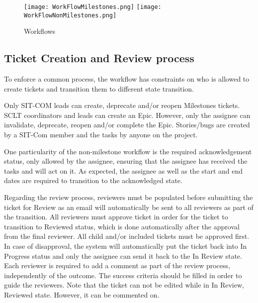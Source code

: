 \documentclass[SE,authoryear,toc]{lsstdoc}
\begin{document}
\begin{figure}[h]
\begin{center}
\texttt{[image: WorkFlowMilestones.png]}
\texttt{[image: WorkFlowNonMilestones.png]}
\caption{\label{fig:workflow} Workflows}
\end{center}
\end{figure}


\subsection{Ticket Creation and Review process}
To enforce a common process, the workflow has constraints on who is allowed to create tickets and transition them to different state transition. 

Only SIT-COM leads can create, deprecate and/or reopen Milestones tickets. SCLT coordinators and leads can create an Epic. 
However, only the assignee can invalidate, deprecate, reopen and/or complete the Epic. 
Stories/bugs are created by a SIT-Com member and the tasks by anyone on the project. 

One particularity of the non-milestone workflow is the required acknowledgement status, only allowed by the assignee, ensuring that the assignee has received the tasks and will act on it. 
As expected, the assignee as well as the start and end dates are required to transition to the acknowledged state.

Regarding the review process, reviewers must be populated before submitting the ticket for Review as an email will automatically be sent to all reviewers as part of the transition. 
All reviewers must approve ticket in order for the ticket to transition to Reviewed status, which is done automatically after the approval from the final reviewer. 
All child and/or included tickets must be approved first. 
In case of disapproval, the system will automatically put the ticket back into In Progress status and only the assignee can send it back to the In Review state. 
Each reviewer is required to add a comment as part of the review process, independently of the outcome. 
The success criteria should be filled in order to guide the reviewers.
Note that the ticket can not be edited while in In Review, Reviewed state. 
However, it can be commented on. 
\end{document}
